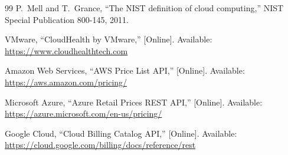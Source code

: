\documentclass[10pt,journal,compsoc]{IEEEtran}
\begin{document}
\begin{thebibliography}{99}
P.~Mell and T.~Grance,
``The NIST definition of cloud computing,''
NIST Special Publication 800-145, 2011.

VMware, ``CloudHealth by VMware,''
[Online]. Available: \url{https://www.cloudhealthtech.com}

Amazon Web Services, ``AWS Price List API,''
[Online]. Available: \url{https://aws.amazon.com/pricing/}

Microsoft Azure, ``Azure Retail Prices REST API,''
[Online]. Available: \url{https://azure.microsoft.com/en-us/pricing/}

Google Cloud, ``Cloud Billing Catalog API,''
[Online]. Available: \url{https://cloud.google.com/billing/docs/reference/rest}

\end{thebibliography}
\end{document}
